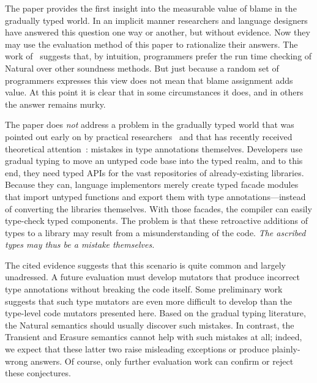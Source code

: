
The paper provides the first insight into the measurable value of blame in the
gradually typed world. In an implicit manner researchers and language designers
have answered this question one way or another, but without evidence. Now they
may use the evaluation method of this paper to rationalize their answers.  The
work of~\citet{tgpk-dls-2018} suggests that, by intuition, programmers prefer
the run time checking of Natural over other soundness methods. But just because
a random set of programmers expresses this view does not mean that blame
assignment adds value. At this point it is clear that in some circumstances
it does, and in others the answer remains murky.

The paper does {\em not\/} address a problem in the gradually typed world that
was pointed out early on by practical researchers~\cite{incorrect-ts,
sta-nt-base-types, wmwz-ecoop-2017} and that has recently received theoretical
attention~\cite{gfd-oopsla-2019, cc-oopsla-20}: mistakes in type annotations
themselves.  Developers use gradual typing to move an untyped code base into the
typed realm, and to this end, they need typed APIs for the vast repositories of
already-existing libraries. Because they can, language implementors merely
create typed facade modules that import untyped functions and export them with
type annotations---instead of converting the libraries themselves. With those
facades, the compiler can easily type-check typed components. The problem is
that these retroactive additions of types to a library may result from a
misunderstanding of the code. \emph{The ascribed types may thus be a mistake
themselves.}

The cited evidence suggests that this scenario is quite common and largely
unadressed.  A future evaluation must develop mutators that produce incorrect
type annotations without breaking the code itself. Some preliminary work
suggests that such type mutators are even more difficult to develop than the
type-level code mutators presented here. Based on the gradual typing literature,
the Natural semantics should usually discover such mistakes. In contrast, the
Transient and Erasure semantics cannot help with such mistakes at all; indeed,
we expect that these latter two raise misleading exceptions or produce
plainly-wrong answers.  Of course, only further evaluation work can confirm or
reject these conjectures.



